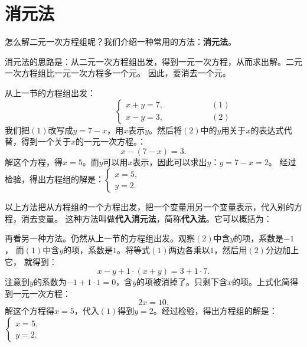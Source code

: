 \documentclass[12pt,UTF8]{ctexbook}
\begin{document}
\section{消元法}
怎么解二元一次方程组呢？我们介绍一种常用的方法：\textbf{消元法}。

消元法的思路是：从二元一次方程组出发，得到一元一次方程，从而求出解。二元一次方程组比一元一次方程多一个元。
因此，要消去一个元。

从上一节的方程组出发：
$$ \quad \quad \quad \quad \quad\left\{
\begin{array}{cr}
     x + y = 7, & \quad \quad \quad \quad \quad (1) \\
     x - y = 3, & \quad \quad \quad \quad \quad (2)
\end{array}\right.
$$
我们把$(1)$改写成$y = 7 - x$，用$x$表示$y$。然后将$(2)$中的$y$用关于$x$的表达式代替，得到一个关于$x$的一元一次方程。：
$$ x - (7 - x) = 3.$$
解这个方程，得$x = 5$。而$y$可以用$x$表示，因此可以求出$y$：$y = 7 - x = 2$。
经过检验，得出方程组的解是：$\left\{ \begin{array}{c}
    x = 5, \\
    y = 2.
\end{array}\right.$

以上方法把从方程组的一个方程出发，把一个变量用另一个变量表示，代入别的方程，消去变量。
这种方法叫做\textbf{代入消元法}，简称\textbf{代入法}。它可以概括为：
\begin{center}
\end{center}

再看另一种方法。仍然从上一节的方程组出发。观察$(2)$中含$y$的项，系数是$-1$，
而$(1)$中含$y$的项，系数是$1$。将等式$(1)$两边各乘以$1$，然后用$(2)$分边加上它，
就得到：
$$ x - y + 1 \cdot (x + y) = 3 + 1 \cdot 7.$$
注意到$y$的系数为$-1 + 1 \cdot 1 = 0$，含$y$的项被消掉了。只剩下含$x$的项。上式化简得到一元一次方程：
$$ 2x = 10.$$
解这个方程得$x = 5$，代入$(1)$得到$y = 2$。经过检验，得出方程组的解是：$\left\{ \begin{array}{c}
    x = 5, \\
    y = 2.
\end{array}\right.$
\end{document}
